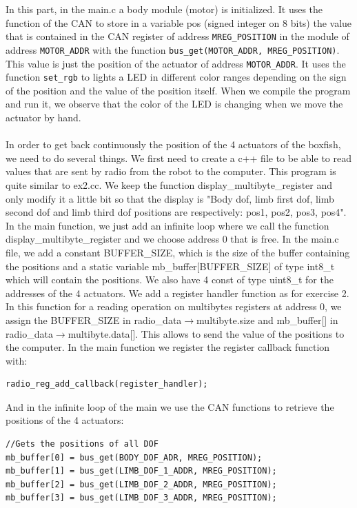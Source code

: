 \documentclass[11pt]{article}
\begin{document}
In this part, in the main.c a body module (motor) is initialized. It uses the function of the CAN to store in a variable pos (signed integer on 8 bits) the value that is contained in the CAN register of address \texttt{MREG\_POSITION} in the module of address \texttt{MOTOR\_ADDR} with the function \texttt{bus\_get(MOTOR\_ADDR, MREG\_POSITION)}. This value is just the position of the actuator of address \texttt{MOTOR\_ADDR}. It uses the function \texttt{set\_rgb} to lights a LED in different color ranges depending on the sign of the position and the value of the position itself. When we compile the program and run it, we observe that the color of the LED is changing when we move the actuator by hand.
\\
\\
In order to get back continuously the position of the 4 actuators of the boxfish, we need to do several things. We first need to create a c++ file to be able to read values that are sent by radio from the robot to the computer. This program is quite similar to ex2.cc. We keep the function display\_multibyte\_register and only modify it a little bit so that the display is "Body dof, limb first dof, limb second dof and limb third dof positions are respectively: pos1, pos2, pos3, pos4". In the main function, we just add an infinite loop where we call the function display\_multibyte\_register and we choose address 0 that is free. In the main.c file, we add a constant BUFFER\_SIZE, which is the size of the buffer containing the positions and a static variable mb\_buffer[BUFFER\_SIZE] of type int8\_t which will contain the positions. We also have 4 const of type uint8\_t for the addresses of the 4 actuators. We add a register handler function as for exercise 2. In this function for a reading operation on multibytes registers at address 0, we assign the BUFFER\_SIZE in radio\_data${\rightarrow}$multibyte.size and mb\_buffer[] in radio\_data${\rightarrow}$multibyte.data[]. This allows to send the value of the positions to the computer. In the main function we register the register callback function with:



\begin{verbatim}
radio_reg_add_callback(register_handler);
\end{verbatim}

And in the infinite loop of the main we use the CAN functions to retrieve the positions of the 4 actuators:

\begin{verbatim}
//Gets the positions of all DOF
mb_buffer[0] = bus_get(BODY_DOF_ADR, MREG_POSITION);
mb_buffer[1] = bus_get(LIMB_DOF_1_ADDR, MREG_POSITION);
mb_buffer[2] = bus_get(LIMB_DOF_2_ADDR, MREG_POSITION);
mb_buffer[3] = bus_get(LIMB_DOF_3_ADDR, MREG_POSITION);
\end{verbatim}
\end{document}
